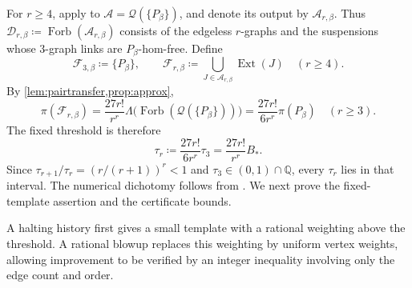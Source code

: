 \documentclass[10pt]{article}
\numberwithin{equation}{section}
\theoremstyle{definition}
\newcommand{\cQ}{\mathcal Q}\newcommand{\cR}{\mathcal R}\newcommand{\cS}{\mathcal S}
\newcommand{\Forb}{\operatorname{Forb}}\newcommand{\Ext}{\operatorname{Ext}}
\begin{document}
For $r\ge4$, apply  to $\mathcal A=\cQ(\{P_\beta\})$, and denote its output by $\mathcal A_{r,\beta}$. Thus $\mathcal D_{r,\beta}\coloneqq\Forb(\mathcal A_{r,\beta})$ consists of the edgeless $r$-graphs and the suspensions whose $3$-graph links are $P_\beta$-hom-free. Define
\[
 \mathcal F_{3,\beta}\coloneqq\{P_\beta\},\qquad
 \mathcal F_{r,\beta}\coloneqq\bigcup_{J\in\mathcal A_{r,\beta}}\Ext(J)
 \quad(r\ge4).
\]
By \cref{lem:pairtransfer,prop:approx},
\begin{equation}\label{eq:v3-numericalexact}
 \pi(\mathcal F_{r,\beta})
 =\frac{27r!}{r^r}\Lambda\bigl(\Forb(\cQ(\{P_\beta\}))\bigr)
 =\frac{27r!}{6r^r}\pi(P_\beta)
 \quad(r\ge3).
\end{equation}
The fixed threshold is therefore
\begin{equation}\label{eq:v3-public-threshold}
 \tau_r\coloneqq\frac{27r!}{6r^r}\tau_3
 =\frac{27r!}{r^r}B_*.
\end{equation}
Since $\tau_{r+1}/\tau_r=(r/(r+1))^r<1$ and $\tau_3\in(0,1)\cap\mathbb Q$, every $\tau_r$ lies in that interval. The numerical dichotomy follows from . We next prove the fixed-template assertion and the certificate bounds.

A halting history first gives a small template with a rational weighting above the threshold. A rational blowup replaces this weighting by uniform vertex weights, allowing improvement to be verified by an integer inequality involving only the edge count and order.
\end{document}
